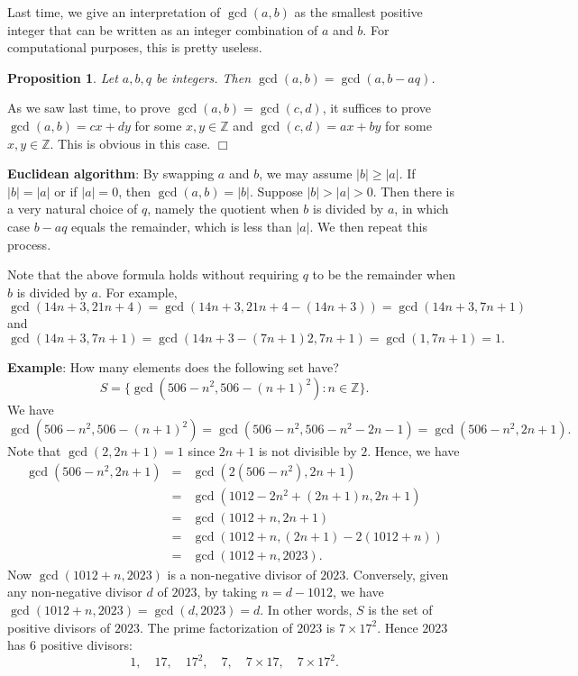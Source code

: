 \documentclass{article}
\def\Z{{\mathbb Z}}
\def\Z{{\mathbb Z}}
\newtheorem{proposition}[subsection]{Proposition}
\newenvironment{proof}{\noindent {\bf Proof:}}{$\Box$ \vspace{2 ex}}
\begin{document}
Last time, we give an interpretation of $\gcd(a,b)$ as the smallest positive integer that can be written as an integer combination of $a$ and $b$. For computational purposes, this is pretty useless.

\begin{proposition}
    Let $a,b,q$ be integers. Then $\gcd(a, b) = \gcd(a, b - aq)$.
\end{proposition}

\begin{proof}
    As we saw last time, to prove $\gcd(a,b) = \gcd(c,d)$, it suffices to prove $\gcd(a,b)=cx + dy$ for some $x,y\in\Z$ and $\gcd(c,d) = ax + by$ for some $x,y\in\Z$. This is obvious in this case.
\end{proof}

\noindent\textbf{Euclidean algorithm}: By swapping $a$ and $b$, we may assume $|b|\geq|a|$. If $|b|=|a|$ or if $|a|=0$, then $\gcd(a,b) = |b|$. Suppose $|b|>|a|>0$. Then there is a very natural choice of $q$, namely the quotient when $b$ is divided by $a$, in which case $b - aq$ equals the remainder, which is less than $|a|$. We then repeat this process.

\vspace{5pt}
Note that the above formula holds without requiring $q$ to be the remainder when $b$ is divided by $a$. For example,
$$\gcd(14n+3, 21n+4) = \gcd(14n+3, 21n+4 - (14n+3)) = \gcd(14n+3, 7n+1)$$
and $$\gcd(14n+3, 7n+1) = \gcd(14n+3-(7n+1)2,7n+1) = \gcd(1, 7n+1) = 1.$$

\noindent\textbf{Example}: How many elements does the following set have? $$S = \{\gcd(506-n^2, 506-(n+1)^2)\colon n\in\Z\}.$$
We have
$$\gcd(506-n^2, 506-(n+1)^2) = \gcd(506-n^2, 506-n^2-2n-1) = \gcd(506-n^2, 2n+1).$$
Note that $\gcd(2, 2n+1) = 1$ since $2n+1$ is not divisible by $2$. Hence, we have
\begin{eqnarray*}
    \gcd(506-n^2, 2n+1) &=& \gcd(2(506-n^2),2n+1)\\ &=& \gcd(1012-2n^2+(2n+1)n,2n+1)\\
    &=&\gcd(1012+n, 2n+1)\\
    &=&\gcd(1012+n, (2n+1)-2(1012+n))\\
    &=&\gcd(1012+n, 2023).
\end{eqnarray*}
Now $\gcd(1012+n, 2023)$ is a non-negative divisor of $2023$. Conversely, given any non-negative divisor $d$ of $2023$, by taking $n = d-1012$, we have $\gcd(1012+n,2023) = \gcd(d,2023) = d$. In other words, $S$ is the set of positive divisors of $2023$. The prime factorization of $2023$ is $7\times 17^2$. Hence $2023$ has $6$ positive divisors:
$$1,\quad 17,\quad 17^2,\quad 7,\quad 7\times17,\quad 7\times17^2.$$
\end{document}
